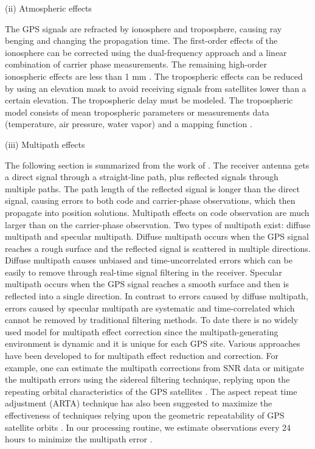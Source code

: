 (ii) Atmospheric effects 

The GPS signals are refracted by ionosphere and troposphere, causing ray benging and changing the propagation time.  The first-order effects of the ionosphere can be corrected using the dual-frequency approach and a linear combination of carrier phase measurements.  The remaining high-order ionospheric effects are less than 1 mm \cite[]{hernandez2007chpt2,petrie2010chpt2}.  The tropospheric effects can be reduced by using an elevation mask to avoid receiving signals from satellites lower than a certain elevation.  The tropospheric delay must be modeled.  The tropospheric model consists of mean tropospheric parameters or measurements data (temperature, air pressure, water vapor) and a mapping function \cite[]{niell1996chpt2,boehm2006chpt2,boehm2007chpt2}.

(iii) Multipath effects 

The following section is summarized from the work of \citet{larson2007chpt2}.  The receiver antenna gets a direct signal through a straight-line path, plus reflected signals through multiple paths.  The path length of the reflected signal is longer than the direct signal, causing errors to both code and carrier-phase observations, which then propagate into position solutions.  Multipath effects on code observation are much larger than on the carrier-phase observation.  Two types of multipath exist: diffuse multipath and specular multipath.  Diffuse multipath occurs when the GPS signal reaches a rough surface and the reflected signal is scattered in multiple directions.  Diffuse multipath causes unbiased and time-uncorrelated errors which can be easily to remove through real-time signal filtering in the receiver.  Specular multipath occurs when the GPS signal reaches a smooth surface and then is reflected into a single direction.   In contrast to errors caused by diffuse multipath, errors caused by specular multipath are systematic and time-correlated which cannot be removed by traditional filtering methods.   To date there is no widely used model for multipath effect correction since the multipath-generating environment is dynamic and it is unique for each GPS site.  Various approaches have been developed to for multipath effect reduction and correction.  For example, one can estimate the multipath corrections from SNR data \cite[e.g.,][]{axelrad1996chpt2} or mitigate the multipath errors using the sidereal filtering technique, replying upon the repeating orbital characteristics of the GPS satellites \cite[e.g.,][]{genrich1992chpt2,choi2004chpt2}.  The aspect repeat time adjustment (ARTA) technique has also been suggested to maximize the effectiveness of techniques relying upon the geometric repeatability of GPS satellite orbits \cite[]{larson2007chpt2}.  In our processing routine, we estimate observations every 24 hours to minimize the multipath error \cite[]{sella2002chpt2}.  

